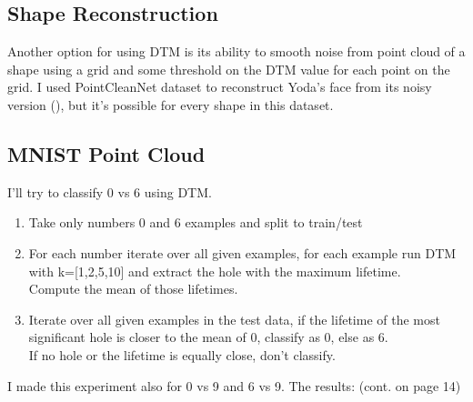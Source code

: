 \documentclass[11pt]{article}
\theoremstyle{definition}
\theoremstyle{definition}
\begin{document}
\subsection{Shape Reconstruction}


Another option for using DTM is its ability to smooth noise from point cloud of a shape using a grid and some threshold on the DTM value for each point on the grid. I used PointCleanNet dataset \cite{point} to reconstruct Yoda's face from its noisy version (), but it's possible for every shape in this dataset.


\subsection{MNIST Point Cloud}
I'll try to classify 0 vs 6 using DTM.
\begin{enumerate}
	\item
		Take only numbers 0 and 6 examples and split to train/test
	\item
		For each number iterate over all given examples, for each example run DTM with k=[1,2,5,10] and extract the hole with the maximum lifetime.\\
		Compute the mean of those lifetimes.
	\item
		Iterate over all given examples in the test data, if the lifetime of the most significant hole is closer to the mean of 0, classify as 0, else as 6.\\
		If no hole or the lifetime is equally close, don't classify.
\end{enumerate}
I made this experiment also for 0 vs 9 and 6 vs 9.
The results: (cont. on page 14)
\end{document}
